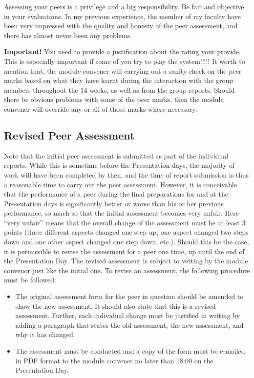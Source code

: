 Assessing your peers is a privilege and a big responsibility. Be fair and objective in your evaluations. In my previous experience, the member of my faculty have been very impressed with the quality and honesty of the peer assessment, and there has almost never been any problems.

\textbf{Important!} You need to provide a justification about the rating your provide. This is especially important if some of you try to play the system!!!!!
It worth to mention that, the module convener will carrying out a sanity check on the peer marks based on what they have learnt during the interaction with the group members throughout the 14 weeks, as well as from the group reports. Should there be obvious problems with some of the peer marks, then the module convener will override any or all of those marks where necessary.


\subsection{Revised Peer Assessment}
Note that the initial peer assessment is submitted as part of the individual reports. While this is sometime before the Presentation days, the majority of work will have been completed by then, and the time of report submission is thus a reasonable time to carry out the peer assessment.
However, it is conceivable that the performance of a peer during the final preparations for and at the Presentation days is significantly better or worse than his or her previous performance, so much so that the initial assessment becomes very unfair. Here “very unfair” means that the overall change of the assessment must be at least 3 points (three different aspects changed one step up, one aspect changed two steps down and one other aspect changed one step down, etc.). Should this be the case, it is permissible to revise the assessment for a peer one time, up until the end of the Presentation Day. The revised assessment is subject to vetting by the module convenor just like the initial one.
To revise an assessment, the following procedure must be followed:
\begin{itemize}
    \item The original assessment form for the peer in question should be amended to show the new assessment. It should also state that this is a revised assessment. Further, each individual change must be justified in writing by adding a paragraph that states the old assessment, the new assessment, and why it has changed.
    \item The assessment must be conducted and a copy of the form must be e-mailed in PDF format to the module convener no later than 18:00 on the Presentation Day.
\end{itemize}


